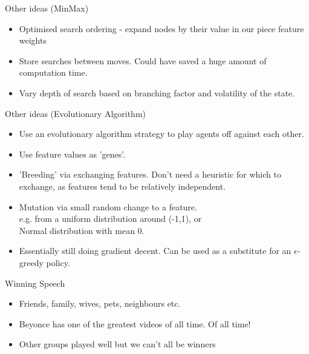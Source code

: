 \documentclass{beamer}
\begin{document}
\begin{frame}{Other ideas (MinMax)}
    \begin{itemize}
  \item
    Optimised search ordering - expand nodes by their value in our piece feature weights
  \item
	Store searches between moves. Could have saved a huge amount of computation time.
  \item
	Vary depth of search based on branching factor and volatility of the state.
  \end{itemize}
\end{frame}

\begin{frame}{Other ideas (Evolutionary Algorithm)}
    \begin{itemize}
  \item
   	Use an evolutionary algorithm strategy to play agents off against each other.
  \item
	Use feature values as 'genes'.
  \item
	'Breeding' via exchanging features. Don't need a heuristic for which to exchange, as features tend to be relatively independent.
  \item
	Mutation via small random change to a feature.
	\\ e.g. from a uniform distribution around (-1,1), or
	\\ Normal distribution with mean 0.
  \item
	Essentially still doing gradient decent. Can be used as a substitute for an $\epsilon$-greedy policy.
  \end{itemize}
\end{frame}

\begin{frame}{Winning Speech}
    \begin{itemize}
  \item
    Friends, family, wives, pets, neighbours etc.
  \item
   Beyonce has one of the greatest videos of all time. Of all time!
  \item
   Other groups played well but we can't all be winners
  \end{itemize}
\end{frame}
\end{document}

